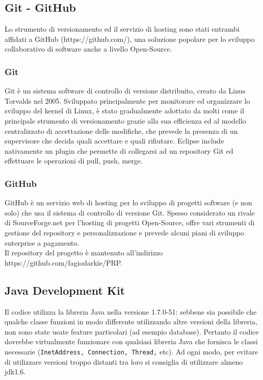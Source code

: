 \documentclass[10pt]{article} %
\begin{document}
\subsection{Git - GitHub}
Lo strumento di versionamento ed il servizio di hosting sono stati entrambi affidati a GitHub (https://github.com/), una soluzione popolare per lo sviluppo collaborativo di software anche a livello Open-Source.
\subsubsection{Git}
Git è un sistema software di controllo di versione distribuito, creato da Linus Torvalds nel 2005. Sviluppato principalmente per monitorare ed organizzare lo sviluppo del kernel di Linux, è stato gradualmente adottato da molti come il principale strumento di versionamento grazie alla sua efficienza ed al modello centralizzato di accettazione delle modifiche, che prevede la presenza di un supervisore che decida quali accettare e quali rifiutare. Eclipse include nativamente un plugin che permette di collegarsi ad un repository Git ed effettuare le operazioni di pull, push, merge.
\subsubsection{GitHub}
GitHub è un servizio web di hosting per lo sviluppo di progetti software (e non solo) che usa il sistema di controllo di versione Git. Spesso considerato un rivale di SourceForge.net per l'hosting di progetti Open-Source, offre vari strumenti di gestione del repository e personalizzazione e prevede alcuni piani di sviluppo enterprise a pagamento.
\\ Il repository del progetto è mantenuto all'indirizzo https://github.com/fagiodarkie/PRP.
\subsection{Java Development Kit}
Il codice utilizza la libreria Java nella versione 1.7.0-51: sebbene sia possibile che qualche classe funzioni in modo differente utilizzando altre versioni della libreria, non sono state usate feature particolari (ad esempio database). Pertanto il codice dovrebbe virtualmente funzionare con qualsiasi libreria Java che fornisca le classi necessarie ({\tt InetAddress, Connection, Thread,} etc). Ad ogni modo, per evitare di utilizzare versioni troppo distanti tra loro si consiglia di utilizzare almeno jdk1.6.
\end{document}
